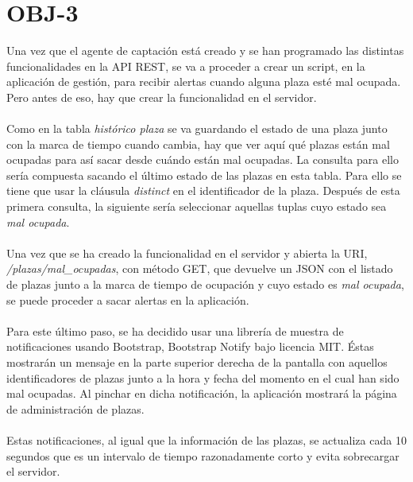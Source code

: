 \section{OBJ-3}
Una vez que el agente de captación está creado y se han programado las distintas funcionalidades en la API REST, se va a proceder a crear un script, en la aplicación de gestión, para recibir alertas cuando alguna plaza esté mal ocupada. Pero antes de eso, hay que crear la funcionalidad en el servidor.
\\\\
Como en la tabla \textit{histórico plaza} se va guardando el estado de una plaza junto con la marca de tiempo cuando cambia, hay que ver aquí qué plazas están mal ocupadas para así sacar desde cuándo están mal ocupadas. La consulta para ello sería compuesta sacando el último estado de las plazas en esta tabla. Para ello se tiene que usar la cláusula \textit{distinct} en el identificador de la plaza. Después de esta primera consulta, la siguiente sería seleccionar aquellas tuplas cuyo estado sea \textit{mal ocupada}.
\\\\
Una vez que se ha creado la funcionalidad en el servidor y abierta la URI,\\
\textit{/plazas/mal\_ocupadas}, con método GET, que devuelve un JSON con el listado de plazas junto a la marca de tiempo de ocupación y cuyo estado es \textit{mal ocupada}, se puede proceder a sacar alertas en la aplicación.
\\\\
Para este último paso, se ha decidido usar una librería de muestra de notificaciones usando Bootstrap, Bootstrap Notify \cite{bootstrap-notify} bajo licencia MIT. Éstas mostrarán un mensaje en la parte superior derecha de la pantalla con aquellos identificadores de plazas junto a la hora y fecha del momento en el cual han sido mal ocupadas. Al pinchar en dicha notificación, la aplicación mostrará la página de administración de plazas.
\\\\
Estas notificaciones, al igual que la información de las plazas, se actualiza cada 10 segundos que es un intervalo de tiempo razonadamente corto y evita sobrecargar el servidor.

